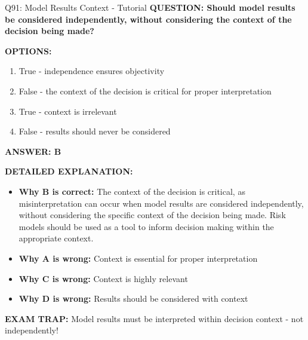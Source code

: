 \documentclass[8pt]{beamer}
\begin{document}
	\begin{frame}{Q91: Model Results Context - Tutorial}
		\fontsize{6.5}{7.5}\selectfont
		\textbf{QUESTION: Should model results be considered independently, without considering the context of the decision being made?}
		
		\vspace{0.1cm}
		\textbf{OPTIONS:}
		\begin{enumerate}
			\item True - independence ensures objectivity
			\item False - the context of the decision is critical for proper interpretation
			\item True - context is irrelevant
			\item False - results should never be considered
		\end{enumerate}
		
		\vspace{0.1cm}
		\textcolor{myblue}{\textbf{ANSWER: B}}
		
		\vspace{0.1cm}
		\textbf{DETAILED EXPLANATION:}
		\begin{itemize}
			\item \textbf{Why B is correct:} The context of the decision is critical, as misinterpretation can occur when model results are considered independently, without considering the specific context of the decision being made. Risk models should be used as a tool to inform decision making within the appropriate context.
			\item \textbf{Why A is wrong:} Context is essential for proper interpretation
			\item \textbf{Why C is wrong:} Context is highly relevant
			\item \textbf{Why D is wrong:} Results should be considered with context
		\end{itemize}
		
		\textcolor{myred}{\textbf{EXAM TRAP:}} Model results must be interpreted \textcolor{myblue}{within decision context} - not independently!
	\end{frame}
	
\end{document}
